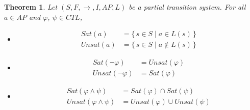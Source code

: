 \documentclass[12pt]{article}
\newcommand{\TRUE}{\mbox{\lstinline{true}}}
\newcommand{\FALSE}{\mbox{\lstinline{false}}}
\newtheorem{theorem}{Theorem}
\theoremstyle{definition}
\begin{document}
\begin{theorem}
Let $(S, F, \rightarrow, I, \mathit{AP}, L)$ be a partial transition system.  For all $a \in \mathit{AP}$ and $\varphi$, $\psi \in \mathit{CTL}$,
\begin{itemize}
\item
\begin{align*}
\mathit{Sat}(a) & = \{\, s \in S \mid a \in L(s) \,\}\\
\mathit{Unsat}(a) & = \{\, s \in S \mid a \not\in L(s) \,\}
\end{align*}
\item
\begin{align*}
\mathit{Sat}(\neg \varphi) & = \mathit{Unsat}(\varphi)\\
\mathit{Unsat}(\neg \varphi) & = \mathit{Sat}(\varphi)
\end{align*}
\item
\begin{align*}
\mathit{Sat}(\varphi \wedge \psi) & = \mathit{Sat}(\varphi) \cap \mathit{Sat}(\psi)\\
\mathit{Unsat}(\varphi \wedge \psi) & = \mathit{Unsat}(\varphi) \cup \mathit{Unsat}(\psi)
\end{align*}

\end{itemize}
\end{theorem}
\end{document}
